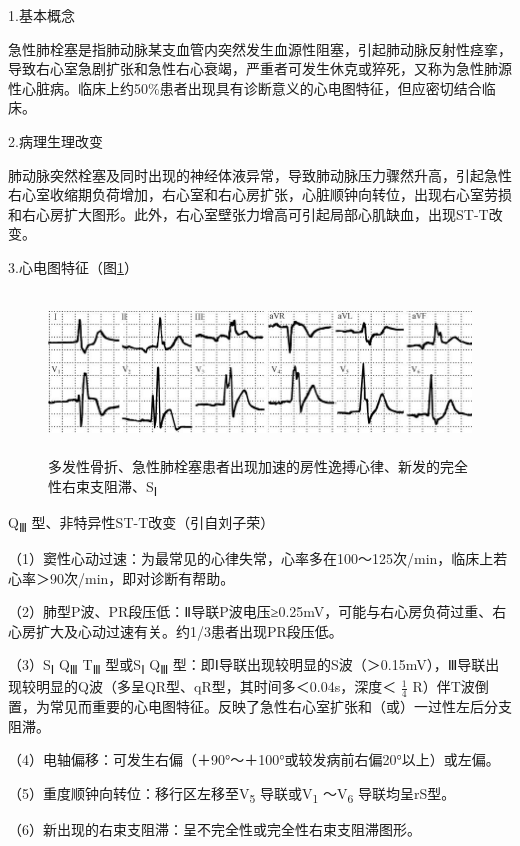1.基本概念

急性肺栓塞是指肺动脉某支血管内突然发生血源性阻塞，引起肺动脉反射性痉挛，导致右心室急剧扩张和急性右心衰竭，严重者可发生休克或猝死，又称为急性肺源性心脏病。临床上约50\%患者出现具有诊断意义的心电图特征，但应密切结合临床。

2.病理生理改变

肺动脉突然栓塞及同时出现的神经体液异常，导致肺动脉压力骤然升高，引起急性右心室收缩期负荷增加，右心室和右心房扩张，心脏顺钟向转位，出现右心室劳损和右心房扩大图形。此外，右心室壁张力增高可引起局部心肌缺血，出现ST-T改变。

3.心电图特征（图\ref{fig42-7}）

\begin{figure}[!htbp]
 \centering
 \includegraphics[width=5.78125in,height=1.67708in]{./images/Image00698.jpg}
 \captionsetup{justification=centering}
 \caption{多发性骨折、急性肺栓塞患者出现加速的房性逸搏心律、新发的完全性右束支阻滞、S\textsubscript{Ⅰ}}
 \label{fig42-7}
  \end{figure} 
Q\textsubscript{Ⅲ} 型、非特异性ST-T改变（引自刘子荣）

（1）窦性心动过速：为最常见的心律失常，心率多在100～125次/min，临床上若心率＞90次/min，即对诊断有帮助。

（2）肺型P波、PR段压低：Ⅱ导联P波电压≥0.25mV，可能与右心房负荷过重、右心房扩大及心动过速有关。约1/3患者出现PR段压低。

（3）S\textsubscript{Ⅰ} Q\textsubscript{Ⅲ} T\textsubscript{Ⅲ}
型或S\textsubscript{Ⅰ} Q\textsubscript{Ⅲ}
型：即Ⅰ导联出现较明显的S波（＞0.15mV），Ⅲ导联出现较明显的Q波（多呈QR型、qR型，其时间多＜0.04s，深度＜
$\frac{1}{4}$
R）伴T波倒置，为常见而重要的心电图特征。反映了急性右心室扩张和（或）一过性左后分支阻滞。

（4）电轴偏移：可发生右偏（＋90°～＋100°或较发病前右偏20°以上）或左偏。

（5）重度顺钟向转位：移行区左移至V\textsubscript{5}
导联或V\textsubscript{1} ～V\textsubscript{6} 导联均呈rS型。

（6）新出现的右束支阻滞：呈不完全性或完全性右束支阻滞图形。

